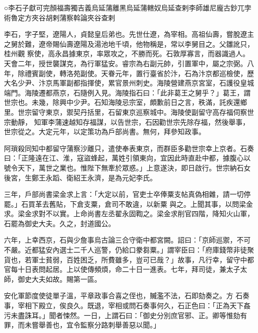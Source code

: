 
\begin{pinyinscope}

 ○李石子獻可完顏福壽獨吉義烏延蒲離黑烏延蒲轄奴烏延查剌李師雄尼龐古鈔兀孛術魯定方夾谷胡剌蒲察斡論夾谷查剌



 李石，字子堅，遼陽人，貞懿皇后弟也。先世仕遼，為宰相。高祖仙壽，嘗脫遼主之舅於難，遼帝賜仙壽遼陽及湯池地千頃，他物稱是，常以李舅目之。父雛訛只，桂州觀
 察使，高永昌據東京，率眾攻之，不勝而死。石敦厚寡言，而器識過人。天會二年，授世襲謀克，為行軍猛安。睿宗為右副元帥，引置軍中，屬之宗弼。八年，除禮賓副使，轉洛苑副使。天眷元年，置行臺省於汴，石為汴京都巡檢使，歷大名少尹、汴京馬軍副都指揮使，累官景州刺史。海陵營建燕京宮室，石護役皇城端門。海陵遷都燕京，石隨例入見。海陵指石曰：「此非葛王之舅乎？」葛王，謂世宗也。未幾，除興中少尹。石知海陵忌宗室，頗歉前日之言，秩滿，託疾還鄉里。世宗留守東京，禦契丹括里，石留東京巡察城中。海陵使副留守高存福伺察世宗動靜，
 知軍李蒲速越知存福謀，以告世宗，石因勸世宗先除存福，然後舉事，世宗從之。大定元年，以定策功為戶部尚書。無何，拜參知政事。



 阿瑣殺同知中都留守蒲察沙離只，遣使奉表東京，而群臣多勸世宗幸上京者。石奏曰：「正隆遠在江、淮，寇盜蜂起，萬姓引領東向，宜因此時直赴中都，據腹心以號令天下，萬世之業也。惟陛下無牽於眾惑。」上意遂決，即日啟行。世宗納石女後宮，生鄭王永蹈、衛紹王永濟，是為元妃李氏。



 三年，戶部尚書梁金求上言：「大定以前，官吏士卒俸粟支帖真偽相雜，請一切停罷。」石買革去舊貼，下倉支粟，倉司不敢違，以新粟
 與之。上聞其事，以問梁金求。梁金求對不以實。上命尚書左丞翟永固鞫之。梁金求削官四階，降知火山軍，石罷為御史大夫。久之，封道國公。



 六年，上幸西京，石與少詹事烏古論三合守衛中都宮闕。詔曰：「京師巡禦，不可不嚴。近都猛安內選士二千人巡警，仍給口豢芻粟。」謂宰臣曰：「府庫錢幣非徒聚貨也，若軍士貧弱，百姓困乏，所費雖多，豈可已哉？」故事，凡行幸，留守中都官每十日表問起居。上以使傳頻煩，命二十日一進表。七年，拜司徒，兼太子太師，御史大夫如故。賜第一區。



 安化軍節度使徒單子溫，平章政事合喜之侄也，贓濫不法，石即劾奏之。方
 石奏事，宰相下殿立，俟良久。既退，宰相或問石奏事何久，石正色曰：「正為天下姦污未盡誅耳。」聞者悚然。一日，上謂石曰：「御史分別庶官邪、正。卿等惟劾有罪，而未嘗舉善也，宜令監察分路刺舉善惡以聞。」




\end{pinyinscope}
